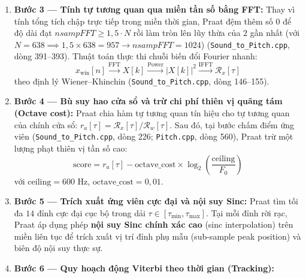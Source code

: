 \documentclass[11pt,a4paper]{article}
\begin{document}
\begin{enumerate}
\begin{thoughtqa}{Chi tiết toán học C5: Tại sao Praat dùng mẫu số $N+1$ thay vì $L-1$?}
    Praat (\texttt{Sound\_to\_Pitch.cpp}, dòng 413) định nghĩa chỉ số chạy từ $i = 1$ đến $N$ với mẫu số $N + 1$:
    \[
    w_{\text{Praat}}[i] = 0{,}5 - 0{,}5 \cos\left(\frac{2\pi i}{N + 1}\right), \quad i = 1, 2, \dots, N
    \]
    Tại hai đầu mút $i = 1$ và $i = N$: $w[1] = w[N] = 0{,}5 - 0{,}5 \cos(2\pi / 641) \approx 0{,}000024 > 0$. Cả $N$ mẫu trong bộ nhớ đều nhận trọng số dương thực sự, không có bất kỳ mẫu nào bị nhân với $0$. Trên FPGA, ta áp dụng chính xác định nghĩa của Praat với $N = 640$, bảo đảm mọi mẫu trong BRAM đều tham gia đóng góp năng lượng.
    \end{thoughtqa}
    \item \textbf{Bước 3 --- Tính tự tương quan qua miền tần số bằng FFT:}
    Thay vì tính tổng tích chập trực tiếp trong miền thời gian, Praat đệm thêm số $0$ để độ dài đạt $nsampFFT \ge 1{,}5 \cdot N$ rồi làm tròn lên lũy thừa của $2$ gần nhất (với $N = 638 \implies 1{,}5 \times 638 = 957 \to nsampFFT = 1024$) (\texttt{Sound\_to\_Pitch.cpp}, dòng 391--393). Thuật toán thực thi chuỗi biến đổi Fourier nhanh:
    \[
    x_{\text{win}}[n] \xrightarrow{\text{FFT}} X[k] \xrightarrow{\text{Power}} |X[k]|^2 \xrightarrow{\text{IFFT}} \mathcal{R}_x[\tau]
    \]
    theo định lý Wiener--Khinchin (\texttt{Sound\_to\_Pitch.cpp}, dòng 146--155).
    \item \textbf{Bước 4 --- Bù suy hao cửa sổ và trừ chi phí thiên vị quãng tám (Octave cost):}
    Praat chia hàm tự tương quan tín hiệu cho tự tương quan của chính cửa sổ: $r_a[\tau] = \mathcal{R}_x[\tau] / \mathcal{R}_w[\tau]$. Sau đó, tại bước chấm điểm ứng viên (\texttt{Sound\_to\_Pitch.cpp}, dòng 226; \texttt{Pitch.cpp}, dòng 560), Praat trừ một lượng phạt thiên vị tần số cao:
    \begin{equation}
    \text{score} = r_a[\tau] - \text{octave\_cost} \times \log_2\left(\frac{\text{ceiling}}{F_0}\right)
    \label{eq:praat_octave_cost_exact}
    \end{equation}
    với $\text{ceiling} = 600\text{ Hz}$, $\text{octave\_cost} = 0{,}01$.
    \item \textbf{Bước 5 --- Trích xuất ứng viên cực đại và nội suy Sinc:}
    Praat tìm tối đa $14$ đỉnh cực đại cục bộ trong dải $\tau \in [\tau_{\min}, \tau_{\max}]$. Tại mỗi đỉnh rời rạc, Praat áp dụng phép \textbf{nội suy Sinc chính xác cao} (sinc interpolation) trên miền liên tục để trích xuất vị trí đỉnh phụ mẫu (sub-sample peak position) và biên độ nội suy thực sự.
    \item \textbf{Bước 6 --- Quy hoạch động Viterbi theo thời gian (Tracking):}

\end{enumerate}
\end{document}
